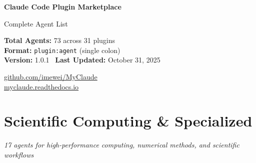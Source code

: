 \documentclass[11pt,a4paper]{article}
\begin{document}
\begin{titlepage}
    \centering
    \vspace*{2cm}

    {\Huge\bfseries\color{primarycolor}Claude Code Plugin Marketplace\par}
    \vspace{1cm}
    {\LARGE\color{secondarycolor}Complete Agent List\par}
    \vspace{2cm}

    \begin{tcolorbox}[colback=tableheader,colframe=primarycolor,arc=3mm,boxrule=1pt]
        \centering
        \large
        \textbf{Total Agents:} 73 across 31 plugins\\[0.3cm]
        \textbf{Format:} \texttt{plugin:agent} (single colon)\\[0.3cm]
        \textbf{Version:} 1.0.1 \textbar\ \textbf{Last Updated:} October 31, 2025
    \end{tcolorbox}

    \vfill

    {\large\color{secondarycolor}
     \href{https://github.com/imewei/MyClaude}{github.com/imewei/MyClaude}\\[0.3cm]
     \href{https://myclaude.readthedocs.io/en/latest/}{myclaude.readthedocs.io}
    \par}

    \vspace{1cm}
\end{titlepage}

\tableofcontents
\newpage

\section{Scientific Computing \& Specialized}
\textit{17 agents for high-performance computing, numerical methods, and scientific workflows}
\end{document}
